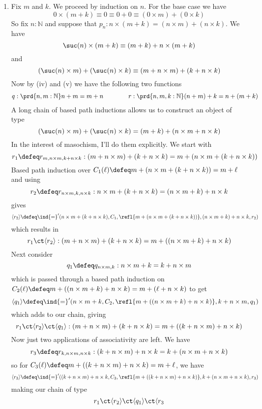 \begin{enumerate}
\item Fix $m$ and $k$.  We proceed by induction on $n$.  For the base case we
have
\[
0 \times (m + k)
\equiv 0
\equiv 0 + 0
\equiv (0 \times m) + (0 \times k)
\]
So fix $n : \mathbb{N}$ and suppose that $p_{n} : n \times (m + k) = (n \times
m) + (n \times k)$.  We have
\[
\suc(n) \times (m + k)
\equiv
(m+k) + n \times (m + k)
\]
and
\[
(\suc(n) \times m) + (\suc(n) \times k)
\equiv
(m + n \times m) + (k + n \times k)
\]
Now by (iv) and (v) we have the following two functions
\begin{align*}
q : \prd{n, m:\mathbb{N}} n + m = m + n
\qquad\qquad
r : \prd{n, m, k:\mathbb{N}} (n + m) + k = n + (m + k)
\end{align*}
A long chain of based path inductions allows us to construct an object of type
\[
(\suc(n) \times m) + (\suc(n) \times k) = (m+k) + (n \times m + n \times k)
\]
In the interest of masochism, I'll do them explicitly.  We start with
\[
r_{1} \defeq r_{m, n \times m, k+n\times k} 
: (m + n \times m) + (k + n \times k)
= m + (n \times m + (k + n \times k))
\]
Based path induction over $C_{1}(\ell) \defeq m + (n \times m + (k + n \times
k)) = m + \ell$ and using
\[
r_{2} \defeq r_{n \times m, k, n \times k}
: n \times m + (k + n \times k)
= (n \times m + k) + n \times k
\]
gives
\[
\langle r_{2} \rangle \defeq 
\ind{=}'(n\times m + (k + n \times k), C_{1}, \refl{m+(n\times m + (k + n
\times k))}, (n \times m + k) + n \times k, r_{2}
)
\]
which results in
\[
r_{1} 
\ct
\langle r_{2} \rangle
:
(m + n \times m) + (k + n \times k)
=
m + ((n \times m + k) + n \times k)
\]
Next consider
\[
q_{1} \defeq q_{n\times m, k} : n \times m + k = k + n \times m
\]
which is passed through a based path induction on $C_{2}(\ell) \defeq m + ((n
\times m + k) + n \times k) =  m + (\ell
+ n \times k)$ to get
\[
\langle q_{1} \rangle
\defeq
\ind{=}'(n \times m + k, C_{2}, \refl{m + ((n \times m + k) + n \times k)}, k + n
\times m, q_{1})
\]
which adds to our chain, giving
\[
r_{1} \ct \langle r_{2} \rangle \ct \langle q_{1} \rangle
:
(m + n \times m) + (k + n \times k)
=
m + ((k + n \times m) + n \times k)
\]
Now just two applications of associativity are left.  We have
\[
r_{3} \defeq r_{k, n \times m, n \times k}
:
(k + n \times m) + n \times k
=
k + (n \times m + n \times k)
\]
so for $C_{3}(\ell) \defeq m + ((k + n \times m) + n \times k) = m + \ell$, we have
\[
\langle r_{3} \rangle \defeq
\ind{=}'((k + n \times m) + n \times k, C_{3}, \refl{m + ((k + n \times m) + n
\times k)}, k + (n \times m + n \times k), r_{3})
\]
making our chain of type
\[
r_{1} \ct \langle r_{2} \rangle \ct \langle q_{1} \rangle \ct \langle r_{3}
\]
\end{enumerate}
